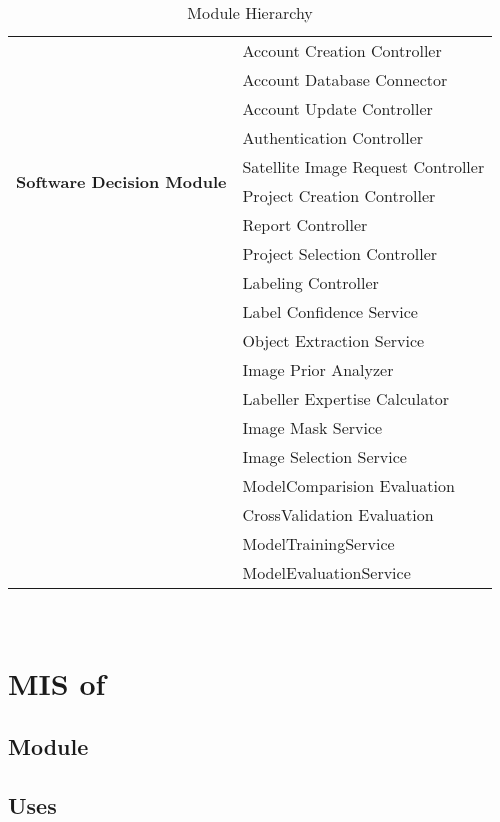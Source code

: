 \documentclass[12pt, titlepage]{article}
\begin{document}
\begin{table}[h!]
\begin{tabular}{p{} p{}}
  \multirow{10}{0.3\textwidth}{\textbf{Software Decision Module}} 
   & Account Creation Controller\\
   & Account Database Connector\\
   & Account Update Controller\\
   & Authentication Controller\\
   & Satellite Image Request Controller\\
   & Project Creation Controller\\
   & Report Controller\\
   & Project Selection Controller\\
   & Labeling Controller\\
   & Label Confidence Service\\
   & Object Extraction Service\\
   & Image Prior Analyzer\\
   & Labeller Expertise Calculator\\
   & Image Mask Service\\
   & Image Selection Service\\
   & ModelComparision Evaluation\\
   & CrossValidation Evaluation\\
   & ModelTrainingService\\
   & ModelEvaluationService\\
  \bottomrule
  \end{tabular}
  \caption{Module Hierarchy}
  \label{TblMH}
  \end{table}

\newpage
~\newpage

\section{MIS of } \label{Module} 



\subsection{Module}


\subsection{Uses}
\end{document}
